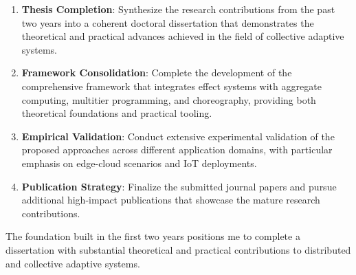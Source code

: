 \documentclass[runningheads]{llncs}
\begin{document}
\begin{enumerate}
\item \textbf{Thesis Completion}: Synthesize the research contributions from the past two years into a coherent doctoral dissertation that demonstrates the theoretical and practical advances achieved in the field of collective adaptive systems.

\item \textbf{Framework Consolidation}: Complete the development of the comprehensive framework that integrates effect systems with aggregate computing, multitier programming, and choreography, providing both theoretical foundations and practical tooling.

\item \textbf{Empirical Validation}: Conduct extensive experimental validation of the proposed approaches across different application domains, with particular emphasis on edge-cloud scenarios and IoT deployments.

\item \textbf{Publication Strategy}: Finalize the submitted journal papers and pursue additional high-impact publications that showcase the mature research contributions.


\end{enumerate}

The foundation built in the first two years positions me to complete a dissertation with substantial theoretical and practical contributions to distributed and collective adaptive systems.

%
%
%



\nocite{*}
\end{document}
